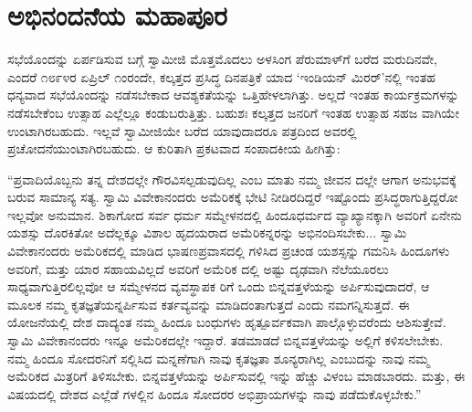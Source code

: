 
\chapter{ಅಭಿನಂದನೆಯ ಮಹಾಪೂರ}

\noindent

ಸಭೆಯೊಂದನ್ನು ಏರ್ಪಡಿಸುವ ಬಗ್ಗೆ ಸ್ವಾಮೀಜಿ ಮೊತ್ತಮೊದಲು ಅಳಸಿಂಗ ಪೆರುಮಾಳ್​ಗೆ ಬರೆದ ಮರುದಿನವೇ, ಎಂದರೆ ೧೮೯೪ರ ಏಪ್ರಿಲ್ ೧ಂರಂದೇ, ಕಲ್ಕತ್ತದ ಪ್ರಸಿದ್ಧ ದಿನಪತ್ರಿಕೆ ಯಾದ ‘ಇಂಡಿಯನ್ ಮಿರರ್​’ನಲ್ಲಿ ಇಂತಹ ಧನ್ಯವಾದ ಸಭೆಯೊಂದನ್ನು ನಡೆಸಬೇಕಾದ ಆವಶ್ಯಕತೆಯನ್ನು ಒತ್ತಿಹೇಳಲಾಗಿತ್ತು. ಅಲ್ಲದೆ ಇಂತಹ ಕಾರ್ಯಕ್ರಮಗಳನ್ನು ನಡೆಸಬೇಕೆಂಬ ಉತ್ಸಾಹ ಎಲ್ಲೆಲ್ಲೂ ಕಂಡುಬರುತ್ತಿತ್ತು. ಬಹುಶಃ ಕಲ್ಕತ್ತದ ಜನರಿಗೆ ಇಂತಹ ಉತ್ಸಾಹ ಸಹಜ ವಾಗಿಯೇ ಉಂಟಾಗಿರಬಹುದು. ಇಲ್ಲವೆ ಸ್ವಾಮೀಜಿಯೇ ಬರೆದ ಯಾವುದಾದರೂ ಪತ್ರದಿಂದ ಅವರಲ್ಲಿ ಪ್ರಚೋದನೆಯುಂಟಾಗಿರಬಹುದು. ಆ ಕುರಿತಾಗಿ ಪ್ರಕಟವಾದ ಸಂಪಾದಕೀಯ ಹೀಗಿತ್ತು:

“ಪ್ರವಾದಿಯೊಬ್ಬನು ತನ್ನ ದೇಶದಲ್ಲೇ ಗೌರವಿಸಲ್ಪಡುವುದಿಲ್ಲ ಎಂಬ ಮಾತು ನಮ್ಮ ಜೀವನ ದಲ್ಲೇ ಆಗಾಗ ಅನುಭವಕ್ಕೆ ಬರುವ ಸಾಮಾನ್ಯ ಸತ್ಯ. ಸ್ವಾಮಿ ವಿವೇಕಾನಂದರು ಅಮೆರಿಕಕ್ಕೆ ಭೇಟಿ ನೀಡಿರದಿದ್ದರೆ ಇಷ್ಟೊಂದು ಪ್ರಸಿದ್ಧರಾಗುತ್ತಿದ್ದರೋ ಇಲ್ಲವೋ ಅನುಮಾನ. ಶಿಕಾಗೋದ ಸರ್ವ ಧರ್ಮ ಸಮ್ಮೇಳನದಲ್ಲಿ ಹಿಂದೂಧರ್ಮದ ವ್ಯಾಖ್ಯಾನಕ್ಕಾಗಿ ಅವರಿಗೆ ಏನೇನು ಯಶಸ್ಸು ದೊರಕಿತೋ ಅದೆಲ್ಲಕ್ಕೂ ವಿಶಾಲ ಹೃದಯರಾದ ಅಮೆರಿಕನ್ನರನ್ನು ಅಭಿನಂದಿಸಬೇಕು... ಸ್ವಾಮಿ ವಿವೇಕಾನಂದರು ಅಮೆರಿಕದಲ್ಲಿ ಮಾಡಿದ ಭಾಷಣಪ್ರವಾಸದಲ್ಲಿ ಗಳಿಸಿದ ಪ್ರಚಂಡ ಯಶಸ್ಸನ್ನು ಗಮನಿಸಿ ಹಿಂದೂಗಳು ಅವರಿಗೆ, ಮತ್ತು ಯಾರ ಸಹಾಯವಿಲ್ಲದೆ ಅವರಿಗೆ ಅಮೆರಿಕ ದಲ್ಲಿ ಅಷ್ಟು ದೃಢವಾಗಿ ನೆಲೆಯೂರಲು ಸಾಧ್ಯವಾಗುತ್ತಿರಲಿಲ್ಲವೋ ಆ ಸಮ್ಮೇಳನದ ವ್ಯವಸ್ಥಾಪಕ ರಿಗೆ ಒಂದು ಬಿನ್ನವತ್ತಳೆಯನ್ನು ಅರ್ಪಿಸುವುದಾದರೆ, ಆ ಮೂಲಕ ನಮ್ಮ ಕೃತಜ್ಞತೆಯನ್ನರ್ಪಿಸುವ ಕರ್ತವ್ಯವನ್ನು ಮಾಡಿದಂತಾಗುತ್ತದೆ ಎಂದು ನಮಗನ್ನಿಸುತ್ತದೆ. ಈ ಯೋಜನೆಯಲ್ಲಿ ದೇಶ ದಾದ್ಯಂತ ನಮ್ಮ ಹಿಂದೂ ಬಂಧುಗಳು ಹೃತ್ಪೂರ್ವಕವಾಗಿ ಪಾಲ್ಗೊಳ್ಳುವರೆಂದು ಆಶಿಸುತ್ತೇವೆ. ಸ್ವಾಮಿ ವಿವೇಕಾನಂದರು ಇನ್ನೂ ಅಮೆರಿಕದಲ್ಲೇ ಇದ್ದಾರೆ. ತಡಮಾಡದೆ ಬಿನ್ನವತ್ತಳೆಯನ್ನು ಅಲ್ಲಿಗೆ ಕಳಿಸಲೇಬೇಕು. ನಮ್ಮ ಹಿಂದೂ ಸೋದರನಿಗೆ ಸಲ್ಲಿಸಿದ ಮನ್ನಣೆಗಾಗಿ ನಾವು ಕೃತಜ್ಞತಾ ಶೂನ್ಯರಾಗಿಲ್ಲ ಎಂಬುದನ್ನು ನಾವು ನಮ್ಮ ಅಮೆರಿಕದ ಮಿತ್ರರಿಗೆ ತಿಳಿಸಬೇಕು. ಬಿನ್ನವತ್ತಳೆಯನ್ನು ಅರ್ಪಿಸುವಲ್ಲಿ ಇನ್ನು ಹೆಚ್ಚು ವಿಳಂಬ ಮಾಡಬಾರದು. ಮತ್ತು, ಈ ವಿಷಯದಲ್ಲಿ ದೇಶದ ಎಲ್ಲೆಡೆ ಗಳಲ್ಲಿನ ಹಿಂದೂ ಸೋದರರ ಅಭಿಪ್ರಾಯಗಳನ್ನು ನಾವು ಪಡೆದುಕೊಳ್ಳಬೇಕು.”

